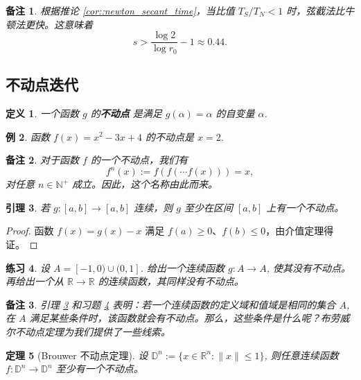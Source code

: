 \documentclass[a4paper]{ctexart}
\newtheorem{theorem}{定理}
\newtheorem{remark}{备注}
\newtheorem{definition}[theorem]{定义} %
\newtheorem{lemma}[theorem]{引理}
\newtheorem{example}[theorem]{例}
\newtheorem{exercise}[theorem]{练习}
\numberwithin{theorem}{section}
\numberwithin{equation}{section}
\numberwithin{figure}{section}
\numberwithin{remark}{section}
\begin{document}
\begin{remark}
根据推论 \ref{cor::newton_secant_time}，当比值 \( T_S / T_N < 1 \) 时，弦截法比牛顿法更快。这意味着
\[
s > \frac{\log 2}{\log r_0} - 1 \approx 0.44.
\]
\end{remark}

\subsection{不动点迭代}

\begin{definition}
一个函数 \( g \) 的\textbf{不动点} 是满足 \( g(\alpha) = \alpha \) 的自变量 \(\alpha\).
\end{definition}

\begin{example}
函数 \( f(x) = x^2 - 3x + 4 \) 的不动点是 \( x = 2 \).
\end{example}

\begin{remark}
对于函数 \( f \) 的一个不动点，我们有
\[
f^n(x) := f(f(\cdots f(x))) = x,
\]
对任意 \( n \in \mathbb{N}^+ \) 成立。因此，这个名称由此而来。
\end{remark}

\begin{lemma}
    \label{lem::fixed_point}
若 \( g : [a, b] \to [a, b] \) 连续，则 \( g \) 至少在区间 \([a, b]\) 上有一个不动点。
\end{lemma}

\begin{proof}
函数 \( f(x) = g(x) - x \) 满足 \( f(a) \geq 0 \)、\( f(b) \leq 0 \)，由介值定理得证。
\end{proof}

\begin{exercise}
    \label{exe::no_fixed_point}
设 \( A = [-1, 0) \cup (0, 1] \). 给出一个连续函数 \( g : A \to A \), 使其没有不动点。
再给出一个从 \( \mathbb{R} \to \mathbb{R} \) 的连续函数，其同样没有不动点。
\end{exercise}

\begin{remark}
引理 \ref{lem::fixed_point} 和习题 \ref{exe::no_fixed_point} 表明：若一个连续函数的定义域和值域是相同的集合 \( A \), 
在 \( A \) 满足某些条件时，该函数就会有不动点。那么，这些条件是什么呢？布劳威尔不动点定理为我们提供了一些线索。
\end{remark}

\begin{theorem}[Brouwer 不动点定理]
    \label{thm::brouwer}
设 \( \mathbb{D}^n := \{ x \in \mathbb{R}^n : \|x\| \leq 1 \} \), 则任意连续函数 \( f : \mathbb{D}^n \to \mathbb{D}^n \) 至少有一个不动点。
\end{theorem}
\end{document}

